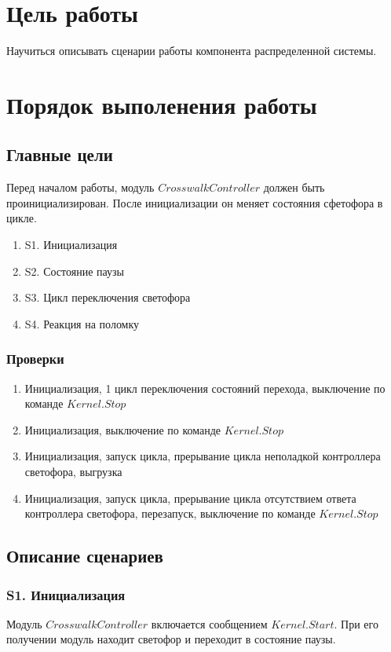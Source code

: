 	\section{Цель работы}
		Научиться описывать сценарии работы компонента распределенной системы.
	\section{Порядок выполенения работы}

	
		\subsection{Главные цели}
			Перед началом работы, модуль $ CrosswalkController $ должен быть проинициализирован.
			После инициализации он меняет состояния сфетофора в цикле.
			\begin{enumerate}
				\item S1. Инициализация
				\item S2. Состояние паузы
				\item S3. Цикл переключения светофора
				\item S4. Реакция на поломку
			\end{enumerate}
			\subsubsection{Проверки}
			\begin{enumerate}
				\item Инициализация, 1 цикл переключения состояний перехода, выключение по команде $ Kernel.Stop $
				\item Инициализация, выключение по команде $ Kernel.Stop $
				\item Инициализация, запуск цикла, прерывание цикла неполадкой контроллера светофора, выгрузка
				\item Инициализация, запуск цикла, прерывание цикла отсутствием ответа контроллера светофора, перезапуск, выключение по команде $ Kernel.Stop $
			\end{enumerate}
		\subsection{Описание сценариев}
		\subsubsection{S1. Инициализация}
			Модуль $ CrosswalkController $ включается сообщением $ Kernel.Start $. 
			При его получении модуль находит светофор и переходит в состояние паузы.
